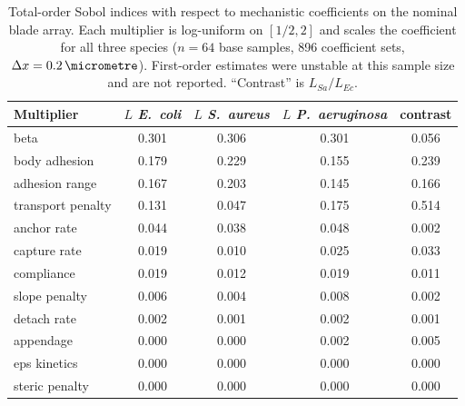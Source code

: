 \begin{table}[h]\centering\small
\caption{Total-order Sobol indices with respect to mechanistic coefficients on the nominal blade array. Each multiplier is log-uniform on $[1/2,2]$ and scales the coefficient for all three species ($n=64$ base samples, 896 coefficient sets, $\Delta x=\SI{0.2}{\micrometre}$). First-order estimates were unstable at this sample size and are not reported. ``Contrast'' is $L_{Sa}/L_{Ec}$.}\label{tab:sobolmech}
\begin{tabular}{lcccc}\toprule Multiplier & $L$ \textit{E.~coli} & $L$ \textit{S.~aureus} & $L$ \textit{P.~aeruginosa} & contrast\\\midrule
beta & 0.301 & 0.306 & 0.301 & 0.056\\
body adhesion & 0.179 & 0.229 & 0.155 & 0.239\\
adhesion range & 0.167 & 0.203 & 0.145 & 0.166\\
transport penalty & 0.131 & 0.047 & 0.175 & 0.514\\
anchor rate & 0.044 & 0.038 & 0.048 & 0.002\\
capture rate & 0.019 & 0.010 & 0.025 & 0.033\\
compliance & 0.019 & 0.012 & 0.019 & 0.011\\
slope penalty & 0.006 & 0.004 & 0.008 & 0.002\\
detach rate & 0.002 & 0.001 & 0.002 & 0.001\\
appendage & 0.000 & 0.000 & 0.002 & 0.005\\
eps kinetics & 0.000 & 0.000 & 0.000 & 0.000\\
steric penalty & 0.000 & 0.000 & 0.000 & 0.000\\
\bottomrule\end{tabular}\end{table}
